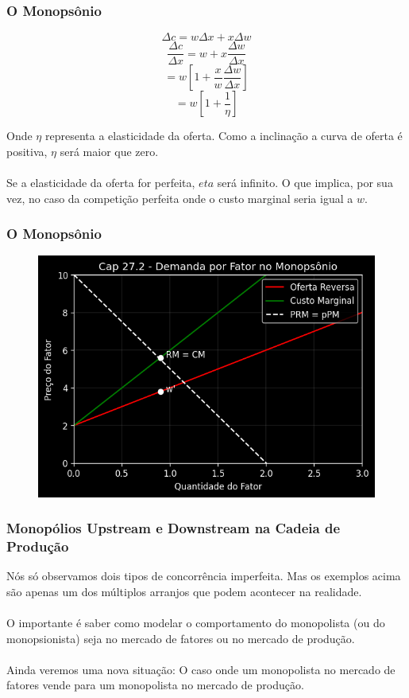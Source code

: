 \documentclass{beamer}[10]
\begin{document}
\begin{frame}
	\frametitle{O Monopsônio}

	$$ \Delta c = w \Delta x + x \Delta w $$
	$$ \frac{\Delta c}{\Delta x} = w + x \frac{\Delta w}{\Delta x} $$
	$$ = w \left[ 1 + \frac{x}{w} \frac{\Delta w}{\Delta x} \right] $$
	$$ = w \left[1 + \frac{1}{\eta} \right] $$

	Onde $\eta$ representa a elasticidade da oferta. Como a inclinação a curva de oferta é positiva, $\eta$ será maior que zero. 
	\\~\\
	Se a elasticidade da oferta for perfeita, $eta$ será infinito. O que implica, por sua vez, no caso da competição perfeita onde o custo marginal seria igual a $w$.

\end{frame}

\begin{frame}
	\frametitle{O Monopsônio}

	\begin{figure}[H]
		\centering
		\includegraphics[scale=0.7]{cap27_2-demanda_fatores_monopsonio.png}
	\end{figure}

\end{frame}

\begin{frame}
	\frametitle{Monopólios Upstream e Downstream na Cadeia de Produção}

	Nós só observamos dois tipos de concorrência imperfeita. Mas os exemplos acima são apenas um dos múltiplos arranjos que podem acontecer na realidade.
	\\~\\
	O importante é saber como modelar o comportamento do monopolista (ou do monopsionista) seja no mercado de fatores ou no mercado de produção.
	\\~\\
	Ainda veremos uma nova situação: O caso onde um monopolista no mercado de fatores vende para um monopolista no mercado de produção.

\end{frame}
\end{document}
